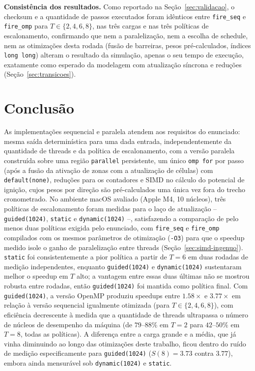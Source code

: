 \documentclass[12pt,a4paper]{article}
\begin{document}
\textbf{Consistência dos resultados.} Como reportado na
Seção~\ref{sec:validacao}, o checksum e a quantidade de passos
executados foram idênticos entre \texttt{fire\_seq} e \texttt{fire\_omp}
para $T\in\{2,4,6,8\}$, nas três cargas e nas três políticas de
escalonamento, confirmando que nem a paralelização, nem a escolha de
schedule, nem as otimizações desta rodada (fusão de barreiras, pesos
pré-calculados, índices \texttt{long long}) alteram o resultado da
simulação, apenas o seu tempo de execução, exatamente como esperado
da modelagem com atualização síncrona e reduções
(Seção~\ref{sec:transicoes}).

\section{Conclusão}

As implementações sequencial e paralela atendem aos requisitos do
enunciado: mesma saída determinística para uma dada entrada,
independentemente da quantidade de threads e da política de
escalonamento, com a versão paralela construída sobre uma região
\texttt{parallel} persistente, um único \texttt{omp for} por passo (após
a fusão da ativação de zonas com a atualização de células) com
\texttt{default(none)}, reduções para os contadores e SIMD no cálculo do
potencial de ignição, cujos pesos por direção são pré-calculados uma
única vez fora do trecho cronometrado. No ambiente macOS avaliado (Apple
M4, 10 núcleos), três políticas de escalonamento foram medidas para o
laço de atualização -- \texttt{guided(1024)}, \texttt{static} e
\texttt{dynamic(1024)} --, satisfazendo a comparação de pelo menos duas
políticas exigida pelo enunciado, com \texttt{fire\_seq} e
\texttt{fire\_omp} compilados com os mesmos parâmetros de otimização
(\texttt{-O3}) para que o speedup medido isole o ganho de
paralelização entre threads (Seção~\ref{sec:simd-ingenuo}).
\texttt{static} foi consistentemente a pior política a partir de
$T=6$ em duas rodadas de medição independentes, enquanto
\texttt{guided(1024)} e \texttt{dynamic(1024)} sustentaram melhor o
speedup em $T$ alto; a vantagem entre essas duas últimas não se mostrou
robusta entre rodadas, então \texttt{guided(1024)}
foi mantida como política final. Com \texttt{guided(1024)}, a
versão OpenMP produziu speedups entre $1.58\times$ e $3.77\times$ em
relação à versão sequencial igualmente otimizada (para
$T\in\{2,4,6,8\}$), com eficiência decrescente à medida que a
quantidade de threads ultrapassa o número de núcleos de desempenho da
máquina (de $79$--$88\%$ em $T=2$ para $42$--$50\%$ em $T=8$, todas as
políticas). A diferença entre a carga grande e a média, que já vinha
diminuindo ao longo das otimizações deste trabalho, ficou dentro do
ruído de medição especificamente para \texttt{guided(1024)}
($S(8)=3.73$ contra $3.77$), embora ainda mensurável sob
\texttt{dynamic(1024)} e \texttt{static}.
\end{document}
